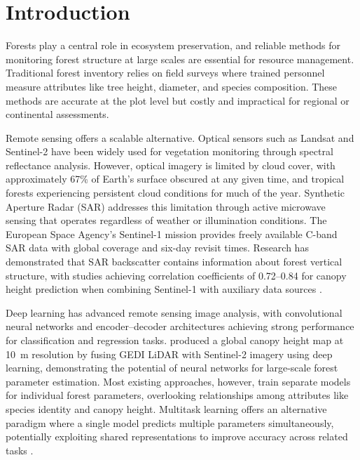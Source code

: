 \chapter{Introduction}
\label{chap:introduction}

Forests play a central role in ecosystem preservation, and reliable methods for monitoring forest structure at large scales are essential for resource management. Traditional forest inventory relies on field surveys where trained personnel measure attributes like tree height, diameter, and species composition. These methods are accurate at the plot level but costly and impractical for regional or continental assessments.

Remote sensing offers a scalable alternative. Optical sensors such as Landsat and Sentinel-2 have been widely used for vegetation monitoring through spectral reflectance analysis. However, optical imagery is limited by cloud cover, with approximately 67\% of Earth's surface obscured at any given time, and tropical forests experiencing persistent cloud conditions for much of the year. Synthetic Aperture Radar (SAR) addresses this limitation through active microwave sensing that operates regardless of weather or illumination conditions. The European Space Agency's Sentinel-1 mission provides freely available C-band SAR data with global coverage and six-day revisit times. Research has demonstrated that SAR backscatter contains information about forest vertical structure, with studies achieving correlation coefficients of 0.72--0.84 for canopy height prediction when combining Sentinel-1 with auxiliary data sources \cite{li_high-resolution_2020,wei_forest_2024}.

Deep learning has advanced remote sensing image analysis, with convolutional neural networks and encoder--decoder architectures achieving strong performance for classification and regression tasks. \citet{lang_high-resolution_2023} produced a global canopy height map at 10~m resolution by fusing GEDI LiDAR with Sentinel-2 imagery using deep learning, demonstrating the potential of neural networks for large-scale forest parameter estimation. Most existing approaches, however, train separate models for individual forest parameters, overlooking relationships among attributes like species identity and canopy height. Multitask learning offers an alternative paradigm where a single model predicts multiple parameters simultaneously, potentially exploiting shared representations to improve accuracy across related tasks \cite{vandenhende_multi-task_2021}.

